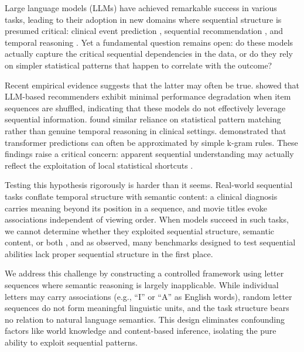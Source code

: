 \documentclass{article}
\theoremstyle{plain}
\theoremstyle{definition}
\theoremstyle{remark}
\begin{document}
Large language models (LLMs) have achieved remarkable success in various tasks, leading to their adoption in new domains where sequential structure is presumed critical: clinical event prediction \citep{savcisens2024using, delphi2025transformer, li2020behrt, rasmy2021medbert}, sequential recommendation \citep{kimLostSequenceLarge2025b}, and temporal reasoning \citep{fatemiTESTTIMEBENCHMARK2025}. Yet a fundamental question remains open: do these models actually capture the critical sequential dependencies in the data, or do they rely on simpler statistical patterns that happen to correlate with the outcome?

Recent empirical evidence suggests that the latter may often be true. \citet{kimLostSequenceLarge2025b} showed that LLM-based recommenders exhibit minimal performance degradation when item sequences are shuffled, indicating that these models do not effectively leverage sequential information. \citet{bediFidelityMedicalReasoning2025} found similar reliance on statistical pattern matching rather than genuine temporal reasoning in clinical settings. \citet{nguyen2024understanding} demonstrated that transformer predictions can often be approximated by simple k-gram rules. These findings raise a critical concern: apparent sequential understanding may actually reflect the exploitation of local statistical shortcuts \cite{mccoy2019right, mirzadeh2024gsm}.

Testing this hypothesis rigorously is harder than it seems. Real-world sequential tasks conflate temporal structure with semantic content: a clinical diagnosis carries meaning beyond its position in a sequence, and movie titles evoke associations independent of viewing order. When models succeed in such tasks, we cannot determine whether they exploited sequential structure, semantic content, or both \cite{geirhos2020shortcut}, and as \citet{klenitskiyDoesItLook2024} observed, many benchmarks designed to test sequential abilities lack proper sequential structure in the first place.

We address this challenge by constructing a controlled framework using letter sequences where semantic reasoning is largely inapplicable. While individual letters may carry associations (e.g., ``I'' or ``A'' as English words), random letter sequences do not form meaningful linguistic units, and the task structure bears no relation to natural language semantics. This design eliminates confounding factors like world knowledge and content-based inference, isolating the pure ability to exploit sequential patterns.
\end{document}
